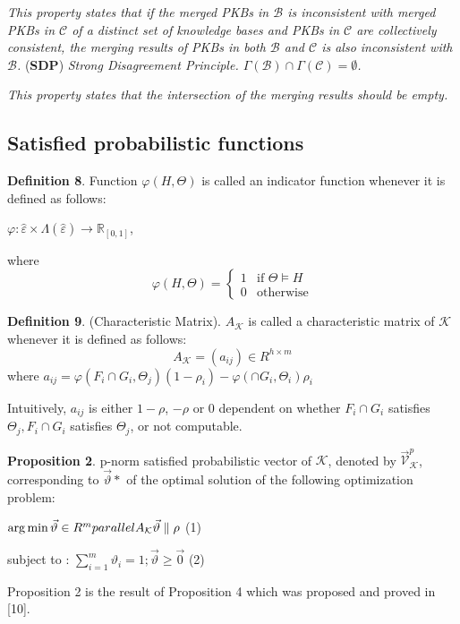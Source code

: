 \documentclass[]{iosart2c}
\begin{document}
\textit{This property states that if the merged PKBs in $\mathcal{B}$ is inconsistent with merged PKBs in $\mathcal{C}$ of a distinct set of knowledge bases and PKBs in $\mathcal{C}$ are collectively consistent, the merging results of PKBs in both $\mathcal{B}$ and $\mathcal{C}$ is also inconsistent with $\mathcal{B}$. 
}
(\textbf{SDP}) \textit{Strong Disagreement Principle. $\Gamma(\mathcal{B}) \cap \Gamma(\mathcal{C}) = \emptyset$.}

\textit{This property states that the intersection of the merging results should be empty.
}
\subsection{Satisfied probabilistic functions}

\textbf{Definition 8}. Function $\varphi(H,\Theta)$ is called an indicator function whenever it is defined as follows:

$\varphi : \hat{\varepsilon} \times \Lambda(\hat{\varepsilon}) \to \mathbb{R}_{[0,1]}$,

where $$\varphi(H,\Theta) =
\begin{cases}
 1	&\text{if $\Theta \models H$} \\
 0	&\text{otherwise}
\end{cases}
$$

\textbf{Definition 9}. (Characteristic Matrix). $A_\mathcal{K}$ is called a characteristic matrix of $\mathcal{K}$ whenever it is defined as follows:
$$
A_\mathcal{K} = (a_{ij}) \in R^{h \times m}
$$
where
$a_{ij} = \varphi(F_i \cap G_i,\Theta_j)(1 - \rho_i) - \varphi(\cap G_i,\Theta_i)\rho_i$

Intuitively, $a_{ij}$ is either $1-\rho$, $-\rho$ or 0 dependent on whether $F_i \cap G_i$ satisfies $\Theta_j, F_i \cap G_i$ satisfies $\Theta_j$, or not computable. 

\textbf{Proposition 2}. p-norm satisfied probabilistic vector of $\mathcal{K}$, denoted by $\vec{\mathcal{V}}^p_\mathcal{K}$, corresponding to $\vec{\vartheta}*$ of the optimal solution of the following optimization problem:

$\arg \min\vec{\vartheta}\in R^m\\parallel A_\mathcal{K} \vec{\vartheta}\parallel\rho$ (1)

subject to : $\sum^m_{i=1}\vartheta_i = 1; \vec{\vartheta}\geq\vec{0}$ (2)

Proposition 2 is the result of Proposition 4 which was proposed and proved in [10]. 
\end{document}
